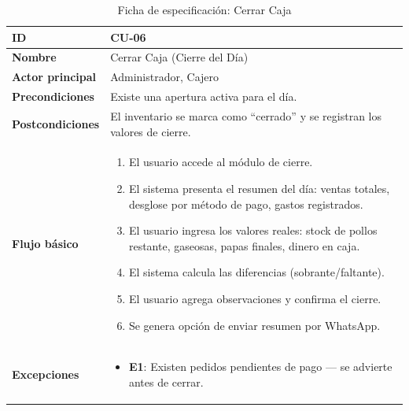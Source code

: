 \documentclass[12pt, a4paper]{article}
\begin{document}
\begin{table}[H]
\centering
\caption{Ficha de especificación: Cerrar Caja}
\begin{tabularx}{\textwidth}{|l|X|}
    \hline
    \textbf{ID} & CU-06 \\ \hline
    \textbf{Nombre} & Cerrar Caja (Cierre del Día) \\ \hline
    \textbf{Actor principal} & Administrador, Cajero \\ \hline
    \textbf{Precondiciones} & Existe una apertura activa para el día. \\ \hline
    \textbf{Postcondiciones} & El inventario se marca como ``cerrado'' y se registran los valores de cierre. \\ \hline
    \textbf{Flujo básico} &
    \begin{enumerate}[nosep, leftmargin=*]
        \item El usuario accede al módulo de cierre.
        \item El sistema presenta el resumen del día: ventas totales, desglose por método de pago, gastos registrados.
        \item El usuario ingresa los valores reales: stock de pollos restante, gaseosas, papas finales, dinero en caja.
        \item El sistema calcula las diferencias (sobrante/faltante).
        \item El usuario agrega observaciones y confirma el cierre.
        \item Se genera opción de enviar resumen por WhatsApp.
    \end{enumerate} \\ \hline
    \textbf{Excepciones} &
    \begin{itemize}[nosep, leftmargin=*]
        \item \textbf{E1}: Existen pedidos pendientes de pago --- se advierte antes de cerrar.
    \end{itemize} \\ \hline
\end{tabularx}
\end{table}
\end{document}
